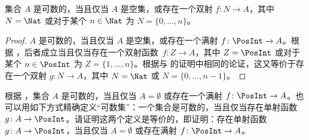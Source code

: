 \documentclass[../../../include/open-logic-section]{subfiles}
\begin{document}
\begin{cor}
集合 $A$ 是可数的，当且仅当 $A$ 是空集，或存在一个双射 $f\colon N \to A$，其中 $N = \Nat$ 或对于某个 $n \in \Nat$ 为 $N = \{0, \dots, n\}$。
\end{cor}

\begin{proof}
$A$ 是可数的，当且仅当 $A$ 是空集，或存在一个满射 $f\colon \PosInt \to A$。根据 ，后者成立当且仅当存在一个双射函数~$f\colon Z \to A$，其中 $Z = \PosInt$ 或对于某个 $n \in \PosInt$ 为 $Z = \{1, \dots, n\}$。根据与  的证明中相同的论证，这又等价于存在一个双射 $g\colon N \to A$，其中 $N = \Nat$ 或 $N = \{0, \dots, n-1\}$。
\end{proof}

\begin{prob}
  根据 ，集合 $A$ 是可数的，当且仅当 $A = \emptyset$ 或存在一个满射 $f\colon \PosInt \to A$。也可以用如下方式精确定义“可数集”：一个集合是可数的，当且仅当存在单射函数 $g\colon A \to \PosInt$。请证明这两个定义是等价的，即证明：存在单射函数 $g\colon A \to \PosInt$，当且仅当 $A = \emptyset$ 或存在满射 $f\colon \PosInt \to A$。
\end{prob}
\end{document}
